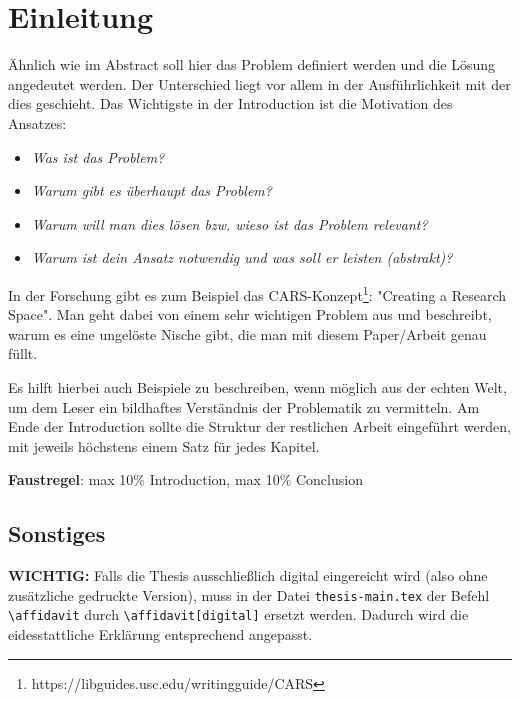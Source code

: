 
\chapter{Einleitung}\label{chapter:introduction}

Ähnlich wie im Abstract soll hier das Problem definiert werden und die Lösung angedeutet werden.
Der Unterschied liegt vor allem in der Ausführlichkeit mit der dies geschieht. 
Das Wichtigste in der Introduction ist die Motivation des Ansatzes: 
\begin{itemize}
	\item \emph{Was ist das Problem?}
	\item \emph{Warum gibt es überhaupt das Problem? }
	\item \emph{Warum will man dies lösen bzw. wieso ist das Problem relevant? }
	\item \emph{Warum ist dein Ansatz notwendig und was soll er leisten (abstrakt)?}
\end{itemize}
In der Forschung gibt es zum Beispiel das CARS-Konzept\footnote{https://libguides.usc.edu/writingguide/CARS}: "Creating a Research Space".
Man geht dabei von einem sehr wichtigen Problem aus und beschreibt, warum es eine ungelöste Nische gibt, die man mit diesem Paper/Arbeit genau füllt.

Es hilft hierbei auch Beispiele zu beschreiben, wenn möglich aus der echten Welt, um dem Leser ein bildhaftes Verständnis der Problematik zu vermitteln.
Am Ende der Introduction sollte die Struktur der restlichen Arbeit eingeführt werden, mit jeweils höchstens einem Satz für jedes Kapitel.

\textbf{Faustregel}: max 10\% Introduction, max 10\% Conclusion


\section{Sonstiges}
\textbf{WICHTIG:} Falls die Thesis ausschließlich digital eingereicht wird (also ohne zusätzliche gedruckte Version), muss in der Datei \texttt{thesis-main.tex} der Befehl \texttt{\textbackslash affidavit} durch \texttt{\textbackslash affidavit[digital]} ersetzt werden.
Dadurch wird die eidesstattliche Erklärung entsprechend angepasst.

